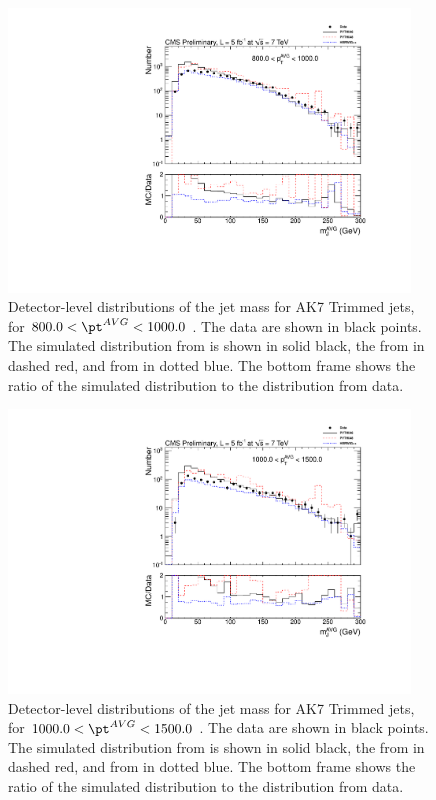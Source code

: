 \begin{figure}[htbp]
\centering
\includegraphics[width=0.95\textwidth]{figs/histAK7MjetVsPtAvg_rawDataMCComparisons_pt_9_Trimmed}
\caption{Detector-level distributions of the jet mass for AK7 Trimmed jets,
for $800.0 < \pt^{AVG} < 1000.0$ \GeVc. The data are shown in black points.
The simulated distribution from \PYTHIA is shown in solid black, 
the from \PYTHIAEIGHT in dashed red, and from \HERWIG in dotted blue. 
The bottom frame shows the ratio of the simulated distribution
to the distribution from data. 
\label{figs:histAK7MjetVsPtAvg_rawDataMCComparisons_pt_9_Trimmed}}
\end{figure}



\begin{figure}[htbp]
\centering
\includegraphics[width=0.95\textwidth]{figs/histAK7MjetVsPtAvg_rawDataMCComparisons_pt_10_Trimmed}
\caption{Detector-level distributions of the jet mass for AK7 Trimmed jets,
for $1000.0 < \pt^{AVG} < 1500.0$ \GeVc. The data are shown in black points.
The simulated distribution from \PYTHIA is shown in solid black, 
the from \PYTHIAEIGHT in dashed red, and from \HERWIG in dotted blue. 
The bottom frame shows the ratio of the simulated distribution
to the distribution from data. 
\label{figs:histAK7MjetVsPtAvg_rawDataMCComparisons_pt_10_Trimmed}}
\end{figure}

